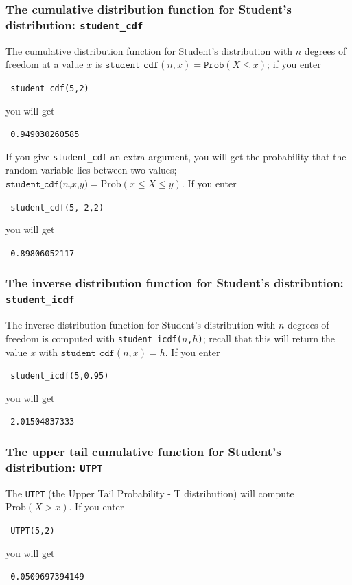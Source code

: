 \documentclass[a4paper,11pt]{book}
\begin{document}
\subsubsection{The cumulative distribution function for Student's
distribution: \texttt{student\_cdf}}

The cumulative distribution function for Student's distribution with
$n$ degrees of freedom at a value $x$ is
$\texttt{student\_cdf}(n,x) = \texttt{Prob}(X \le x)$; if you
enter
\begin{center}
  \tt
  student\_cdf(5,2)
\end{center}
you will get
\begin{center}
  \tt
  0.949030260585
\end{center}

If you give \texttt{student\_cdf} an extra argument,
you will get the probability that
the random variable lies between two values;
$\texttt{student\_cdf($n$,$x$,$y$)} = \text{Prob}(x \le X \le y)$.  If you
enter
\begin{center}
  \tt
  student\_cdf(5,-2,2)
\end{center}
you will get
\begin{center}
  \tt
  0.89806052117
\end{center}

\subsubsection{The inverse distribution function for Student's
distribution: \texttt{student\_icdf}}

The inverse distribution function for Student's
distribution with $n$ degrees of freedom is computed with
\texttt{student\_icdf($n$,$h$)}; recall that this will return the
value $x$ with $\texttt{student\_cdf}(n,x) = h$.  If you enter
\begin{center}
  \tt
  student\_icdf(5,0.95)
\end{center}
you will get
\begin{center}
  \tt
  2.01504837333
\end{center}


\subsubsection{The upper tail cumulative function for Student's
distribution: \texttt{UTPT}}

The \texttt{UTPT} (the Upper Tail Probability - T distribution) will compute
$\text{Prob}(X > x)$.  
If you enter
\begin{center}
  \tt
  UTPT(5,2)
\end{center}
you will get
\begin{center}
  \tt
  0.0509697394149
\end{center}
\end{document}
